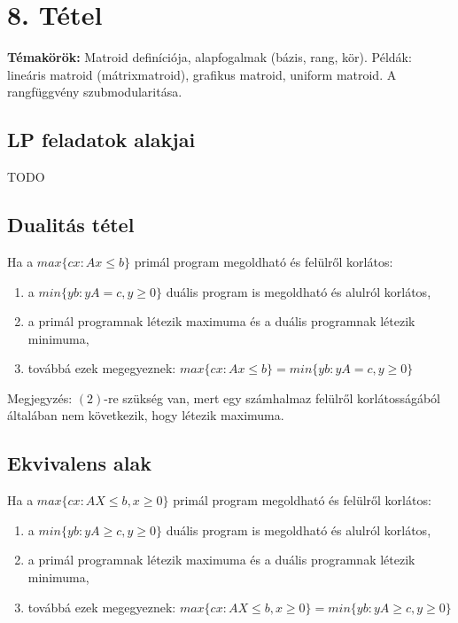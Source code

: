 
\setcounter{chapter}{8}
\chapter*{8. Tétel}

\textbf{Témakörök:} Matroid definíciója, alapfogalmak (bázis, rang, kör). Példák: lineáris matroid (mátrixmatroid), grafikus matroid, uniform matroid. A rangfüggvény szubmodularitása.

\noindent\hrulefill

\section*{LP feladatok alakjai}

\begin{theo} TODO \end{theo}

\section*{Dualitás tétel}

\begin{theo} 
Ha a $max \lbrace c x: Ax\leq b\rbrace$ primál program megoldható és felülről korlátos:
\begin{enumerate}
\item	a $min \lbrace yb: yA=c,y\geq 0\rbrace$ duális program is megoldható és alulról korlátos,
\item	a primál programnak létezik maximuma és a duális programnak létezik minimuma,
\item	továbbá ezek megegyeznek: $max\lbrace cx: Ax\leq b\rbrace = min\lbrace yb: yA=c,y\geq 0\rbrace$
\end{enumerate}
\end{theo}
Megjegyzés: $(2)$-re szükség van, mert egy számhalmaz felülről korlátosságából általában nem következik, hogy létezik maximuma.

\section*{Ekvivalens alak}
\begin{theo}
Ha a $max\lbrace cx:AX\leq b,x\geq 0\rbrace$ primál program megoldható és felülről korlátos:
\begin{enumerate}
\item a $min \lbrace yb:yA\geq c, y \geq 0\rbrace$ duális program is megoldható és alulról korlátos,
\item	a primál programnak létezik maximuma és a duális programnak létezik minimuma,
\item	továbbá ezek megegyeznek: $max\lbrace cx:AX\leq b,x\geq 0\rbrace = min \lbrace yb:yA\geq c, y \geq 0\rbrace$
\end{enumerate}
\end{theo}

